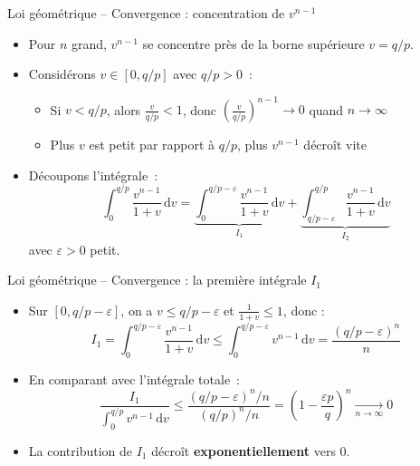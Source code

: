 \documentclass[11pt,aspectratio=169]{beamer}
\newcommand{\dd}{\mathrm{d}}
\begin{document}
\begin{frame}{Loi géométrique -- Convergence : concentration de $v^{n-1}$}

  \begin{itemize}

  \item Pour $n$ grand, $v^{n-1}$ se concentre près de la borne supérieure $v = q/p$.\newline

  \item Considérons $v \in [0, q/p]$ avec $q/p > 0$~:\newline
    \begin{itemize}
    \item Si $v < q/p$, alors $\frac{v}{q/p} < 1$, donc $\left(\frac{v}{q/p}\right)^{n-1} \to 0$ quand $n \to \infty$\newline
    \item Plus $v$ est petit par rapport à $q/p$, plus $v^{n-1}$ décroît vite\newline
  \end{itemize}

  \item  Découpons l'intégrale~:
    \[
      \int_0^{q/p} \frac{v^{n-1}}{1+v} \, \dd v = \underbrace{\int_0^{q/p - \varepsilon} \frac{v^{n-1}}{1+v} \, \dd v}_{I_1} + \underbrace{\int_{q/p - \varepsilon}^{q/p} \frac{v^{n-1}}{1+v} \, \dd v}_{I_2}
    \]
    avec $\varepsilon > 0$ petit.
\end{itemize}

\end{frame}

\begin{frame}{Loi géométrique -- Convergence : la première intégrale $I_1$}

  \begin{itemize}

  \item Sur $[0, q/p - \varepsilon]$, on a $v \leq q/p - \varepsilon$ et $\frac{1}{1+v} \leq 1$, donc :
    \[
      I_1 = \int_0^{q/p - \varepsilon} \frac{v^{n-1}}{1+v} \, \dd v \leq \int_0^{q/p - \varepsilon} v^{n-1} \, \dd v = \frac{(q/p - \varepsilon)^n}{n}
    \]

  \item En comparant avec l'intégrale totale~:
    \[
      \frac{I_1}{\int_0^{q/p} v^{n-1} \, \dd v} \leq \frac{(q/p - \varepsilon)^n / n}{(q/p)^n / n} = \left(1 - \frac{\varepsilon p}{q}\right)^n \xrightarrow[n \to \infty]{} 0
    \]

  \item La contribution de $I_1$ décroît \textbf{exponentiellement} vers 0.
    
  \end{itemize}

\end{frame}
\end{document}
